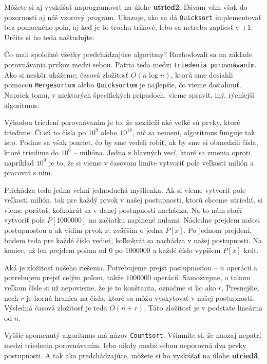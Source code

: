 Môžete si aj vyskúšať naprogramovať na úlohe \textbf{utried2}. Dávam vám však do pozornosti aj náš
vzorový program. Ukazuje, ako sa dá \texttt{Quicksort} implementovať bez pomocného poľa, aj keď je
to trochu trikové, lebo sa netreba zapliesť v $\pm 1$. Určite si ho teda naštudujte.


Čo mali spoločné všetky predchádzajúce algoritmy? Rozhodovali sa na základe porovnávania prvkov
medzi sebou. Patria teda medzi \texttt{triedenia porovnávaním}. Ako si neskôr ukážeme, časová
zložitosť $O(n \log n)$, ktorú sme dosiahli pomocou \texttt{Mergesortom} alebo \texttt{Quicksortom}
je najlepšie, čo vieme dosiahnuť. Napriek tomu, v niektorých špecifických prípadoch, vieme spraviť,
iný, rýchlejší algoritmus.

Výhodou triedení porovnávaním je to, že nezáleží aké veľké sú prvky, ktoré triedime. Či sú to čísla
po $10^9$ alebo $10^{18}$, nič sa nemení, algoritmus funguje tak isto. Poďme sa však pozrieť, čo by
sme vedeli robiť, ak by sme si obmedzili čísla, ktoré triedime do $10^6$ -- milióna. Jedna z
hlavných vecí, ktoré sa zmenia oproti napríklad $10^9$ je to, že si vieme v časovom limite vytvoriť
pole veľkosti milión a pracovať s ním.

Prichádza teda jedna veľmi jednoduchá myšlienka. Ak si vieme vytvoriť pole veľkosti milión, tak pre
každý prvok v našej postupnosti, ktorú chceme utriediť, si vieme porátať, koľkokrát sa v danej
postupnosti nachádza. Na to nám stačí vytvoriť pole $P[1000000]$ na začiatku naplnené nulami.
Následne prejdem našou postupnosťou a ak vidím prvok $x$, zväčším o jedna $P[x]$. Po jednom
prejdení, budem teda pre každé číslo vedieť, koľkokrát sa nachádza v našej postupnosti. Na koniec,
už len prejdem poľom od $0$ po $1000000$ a každé číslo vypíšem $P[x]$ krát.

Aká je zložitosť našeho riešenia. Potrebujeme prejsť postupnosťou -- $n$ operácií a potrebujem
prejsť celým poľom, takže $1000000$ operácií. Samozrejme, o takom veľkom čísle si už nepovieme, že
je to konštanta, označme si ho ako $r$. Presnejšie, nech $r$ je horná hranica na čísla, ktoré sa
môžu vyskytovať v našej postupnosti. Výsledná časová zložitosť je teda $O(n+r)$. Táto zložitosť je
v podstate lineárna od $n$.

Vyššie spomenutý algoritmus má názov \texttt{Countsort}. Všimnite si, že naozaj nepatrí medzi
triedenia porovnávaním, lebo nikdy medzi sebou neporovná dva prvky postupnosti. A tak ako
predchádzajúce, môžete si ho vyskúšať na úlohe \textbf{utried3}.

